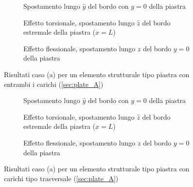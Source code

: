 \documentclass[a4paper,num-refs]{oup-contemporary}
\begin{document}
\begin{figure}[bt!]
	\centering

	\begin{subfigure}[t]{0.3\textwidth}
		\centering
		\caption{Spostamento lungo $\hat y$ del bordo con $y=0$ della piastra}
		
	\end{subfigure}
	\hfill
	\begin{subfigure}[t]{0.3\textwidth}
		\centering
		
		\caption{Effetto torsionale, spostamento lungo $\hat z$ del bordo estremale della piastra ($x=L$)}
		
	\end{subfigure}
	\hfill
	\begin{subfigure}[t]{0.3\textwidth}
		\centering
		\caption{Effetto flessionale, spostamento lungo $z$ del bordo $y=0$ della piastra}
		
	\end{subfigure}
	\hfill
	\caption{Risultati caso (a) per un elemento strutturale tipo piastra con entrambi i carichi (\cref{sec:plate_A})}
	\label{fig:plate_A_both_load}

	\centering
	
	\begin{subfigure}[t]{0.3\textwidth}
		\centering
		\caption{Spostamento lungo $\hat y$ del bordo con $y=0$ della piastra}
		
	\end{subfigure}
	\hfill
	\begin{subfigure}[t]{0.3\textwidth}
		\centering
		
		\caption{Effetto torsionale, spostamento lungo $\hat z$ del bordo estremale della piastra ($x=L$)}
		
	\end{subfigure}
	\hfill
	\begin{subfigure}[t]{0.3\textwidth}
		\centering
		\caption{Effetto flessionale, spostamento lungo $z$ del bordo $y=0$ della piastra}
		\label{fig:plate_A_extra}
	\end{subfigure}
	\hfill
	\caption{Risultati caso (a) per un elemento strutturale tipo piastra con carichi tipo trasversale (\cref{sec:plate_A})}
	\label{fig:plate_A_transload_load}


\end{figure}
\end{document}

